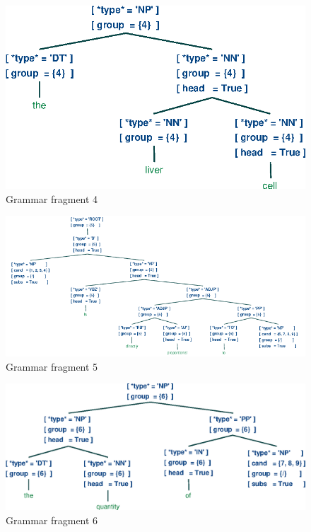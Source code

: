 \documentclass[a4paper]{article}
\begin{document}
\begin{figure}[h]
    \begin{center}
        \includegraphics[scale=0.5]{4.eps}
    \end{center}
    \caption{Grammar fragment 4}
\end{figure}
\begin{figure}[h]
    \begin{center}
        \includegraphics[scale=0.5]{5.png}
    \end{center}
    \caption{Grammar fragment 5}
\end{figure}
\begin{figure}[h]
    \begin{center}
        \includegraphics[scale=0.5]{6.eps}
    \end{center}
    \caption{Grammar fragment 6}
\end{figure}
\end{document}

